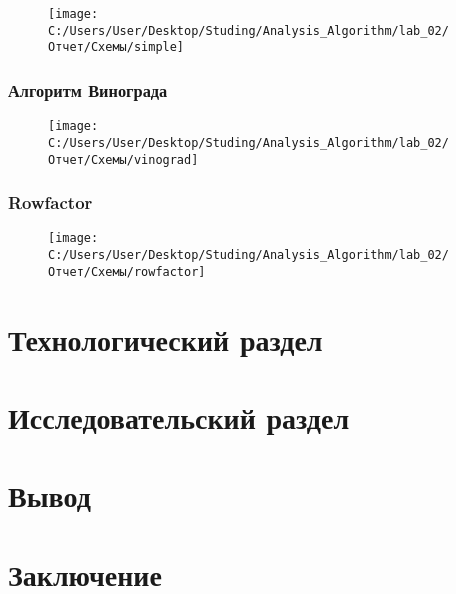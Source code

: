 \documentclass[a4paper, 14pt]{article}
\begin{document}
	\begin{figure}[]
		\centering
		\texttt{[image: C:/Users/User/Desktop/Studing/Analysis\_Algorithm/lab\_02/Отчет/Схемы/simple]}
		\caption{}
		\label{fig:simple}
	\end{figure}
	
	
	\subsubsection{Алгоритм Винограда}
	
	\begin{figure}[]
		\centering
		\texttt{[image: C:/Users/User/Desktop/Studing/Analysis\_Algorithm/lab\_02/Отчет/Схемы/vinograd]}
		\caption{}
		\label{fig:vinograd}
	\end{figure}
	
	
	\subsubsection{Rowfactor}
	
	\begin{figure}[]
		\centering
		\texttt{[image: C:/Users/User/Desktop/Studing/Analysis\_Algorithm/lab\_02/Отчет/Схемы/rowfactor]}
		\caption{}
		\label{fig:rowfactor}
	\end{figure}
	
	
	\newpage
	\section{Технологический раздел}
	
	\newpage
	\section{Исследовательский раздел}
	
	\newpage
	\section{Вывод}
	
	\newpage
	\section{Заключение}
\end{document}
